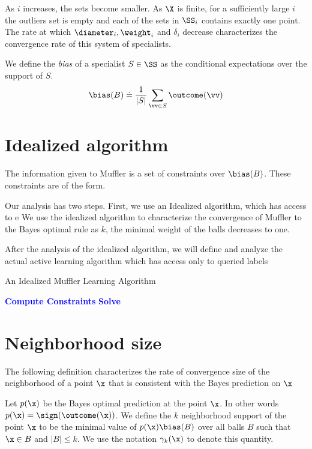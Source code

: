As $i$ increases, the sets become smaller. As $\X$ is finite, for a
sufficiently large $i$ the outliers set is empty and each of the sets
in $\SS_i$ contains exactly one point. The rate at which
$\diameter_i, \weight_i$ and $\delta_i$ decrease characterizes the
convergence rate of this system of specialists.

We define the {\em bias} of a specialist $S \in \SS$ as the 
conditional expectations over the support of $S$.
$$
\bias(B) \doteq \frac{1}{|S|} \sum_{\vv \in S} \outcome(\vv)
$$

\section{Idealized algorithm}

The information given to Muffler is a set of constraints over
$\bias(B)$. These constraints are of the form.

Our analysis has two steps. First, we use an Idealized algorithm,
which has access to e We
use the idealized algorithm to characterize the convergence of
Muffler to the Bayes optimal rule as $k$, the minimal weight of the balls
decreases to one.

After the analysis of the idealized algorithm, we will define and
analyze the actual active learning algorithm which has access only to
queried labels

\begin{algorithm}[]
   \caption{An Idealized Muffler Learning Algorithm}
   \label{alg:activealg}
\begin{algorithmic}
   \STATE \textbf{\textcolor{blue}{Compute Constraints}}
   \STATE \textbf{\textcolor{blue}{Solve}}
   \ENDFOR
\end{algorithmic}
\end{algorithm}

\section{Neighborhood size}

The following definition characterizes the rate of convergence size of the neighborhood of a
point $\x$ that is consistent with the Bayes prediction on $\x$
\begin{definition}
Let $p(\x)$ be the Bayes optimal prediction at the point $\x$. In
other words $p(\x) = \sign(\outcome(\x))$. We define the $k$ neighborhood
support  of the  point $\x$ to be the minimal value of $p(\x)\bias(B)$
over all balls $B$ such that $\x \in B$ and $|B|\leq k$. We use the
notation $\gamma_k(\x)$ to denote this quantity.
\end{definition}

